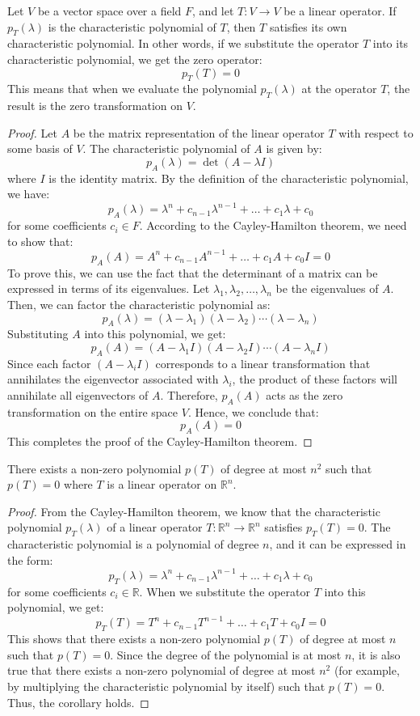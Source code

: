 \documentclass[openany]{book}
\begin{document}
\begin{mytheorem}
    Let $V$ be a vector space over a field $F$, and let $T: V \to V$ be a linear operator. If $p_T(\lambda)$ is the characteristic polynomial of $T$, then $T$ satisfies its own characteristic polynomial. In other words, if we substitute the operator $T$ into its characteristic polynomial, we get the zero operator:
    $$p_T(T) = 0$$
    This means that when we evaluate the polynomial $p_T(\lambda)$ at the operator $T$, the result is the zero transformation on $V$.
\end{mytheorem}
\begin{proof}
    Let $A$ be the matrix representation of the linear operator $T$ with respect to some basis of $V$. The characteristic polynomial of $A$ is given by:
    $$p_A(\lambda) = \det(A - \lambda I)$$
    where $I$ is the identity matrix. By the definition of the characteristic polynomial, we have:
    $$p_A(\lambda) = \lambda^n + c_{n-1}\lambda^{n-1} + \ldots + c_1\lambda + c_0$$
    for some coefficients $c_i \in F$. According to the Cayley-Hamilton theorem, we need to show that:
    $$p_A(A) = A^n + c_{n-1}A^{n-1} + \ldots + c_1A + c_0I = 0$$
    To prove this, we can use the fact that the determinant of a matrix can be expressed in terms of its eigenvalues. Let $\lambda_1, \lambda_2, \ldots, \lambda_n$ be the eigenvalues of $A$. Then, we can factor the characteristic polynomial as:
    $$p_A(\lambda) = (\lambda - \lambda_1)(\lambda - \lambda_2) \cdots (\lambda - \lambda_n)$$
    Substituting $A$ into this polynomial, we get:
    $$p_A(A) = (A - \lambda_1 I)(A - \lambda_2 I) \cdots (A - \lambda_n I)$$
    Since each factor $(A - \lambda_i I)$ corresponds to a linear transformation that annihilates the eigenvector associated with $\lambda_i$, the product of these factors will annihilate all eigenvectors of $A$. Therefore, $p_A(A)$ acts as the zero transformation on the entire space $V$. Hence, we conclude that:
    $$p_A(A) = 0$$
    This completes the proof of the Cayley-Hamilton theorem.
\end{proof}
\begin{corollary}
    There exists a non-zero polynomial $p(T)$ of degree at most $n^2$ such that $p(T) = 0$ where $T$ is a linear operator on $\mathbb{R}^n$.
\end{corollary}
\begin{proof}
    From the Cayley-Hamilton theorem, we know that the characteristic polynomial $p_T(\lambda)$ of a linear operator $T: \mathbb{R}^n \to \mathbb{R}^n$ satisfies $p_T(T) = 0$. The characteristic polynomial is a polynomial of degree $n$, and it can be expressed in the form:
    $$p_T(\lambda) = \lambda^n + c_{n-1}\lambda^{n-1} + \ldots + c_1\lambda + c_0$$
    for some coefficients $c_i \in \mathbb{R}$. When we substitute the operator $T$ into this polynomial, we get:
    $$p_T(T) = T^n + c_{n-1}T^{n-1} + \ldots + c_1T + c_0I = 0$$
    This shows that there exists a non-zero polynomial $p(T)$ of degree at most $n$ such that $p(T) = 0$. Since the degree of the polynomial is at most $n$, it is also true that there exists a non-zero polynomial of degree at most $n^2$ (for example, by multiplying the characteristic polynomial by itself) such that $p(T) = 0$. Thus, the corollary holds.
\end{proof}
\end{document}
